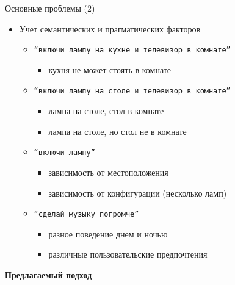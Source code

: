 \documentclass{beamer}
\begin{document}
\begin{frame}{Основные проблемы (2)}
\begin{itemize}
	\item Учет семантических и прагматических факторов
	\bigskip
		\begin{itemize}
			\item \texttt{``включи лампу на кухне и телевизор в комнате''}
				\begin{itemize}
					\item кухня не может стоять в комнате
				\end{itemize}
			\item \texttt{``включи лампу на столе и телевизор в комнате''}
				\begin{itemize}
					\item лампа на столе, стол в комнате
					\item лампа на столе, но стол не в комнате
				\end{itemize}
			\item \texttt{``включи лампу''}
				\begin{itemize}
					\item зависимость от местоположения
					\item зависимость от конфигурации (несколько ламп)
				\end{itemize}
			\item \texttt{``сделай музыку погромче''}
				\begin{itemize}
					\item разное поведение днем и ночью
					\item различные пользовательские предпочтения
				\end{itemize}
		\end{itemize}
\end{itemize}
\end{frame}

\begin{frame}{}
\begin{center}
	\textbf{Предлагаемый подход}\\
\end{center}
\end{frame}
\end{document}
